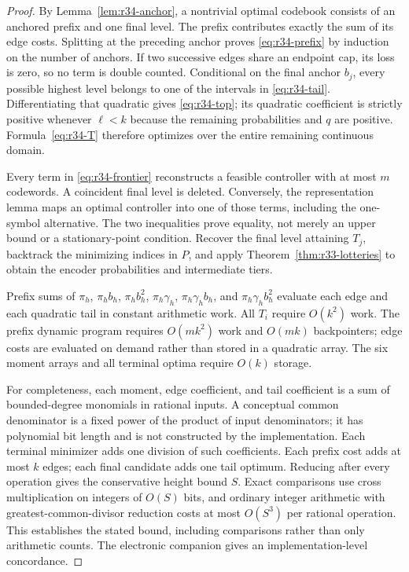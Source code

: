 \begin{proof}
By Lemma~\ref{lem:r34-anchor}, a nontrivial optimal codebook consists of an anchored prefix and one final level. The prefix contributes exactly the sum of its edge costs. Splitting at the preceding anchor proves \eqref{eq:r34-prefix} by induction on the number of anchors. If two successive edges share an endpoint cap, its loss is zero, so no term is double counted. Conditional on the final anchor $b_j$, every possible highest level belongs to one of the intervals in \eqref{eq:r34-tail}. Differentiating that quadratic gives \eqref{eq:r34-top}; its quadratic coefficient is strictly positive whenever $\ell<k$ because the remaining probabilities and $q$ are positive. Formula~\eqref{eq:r34-T} therefore optimizes over the entire remaining continuous domain.

Every term in \eqref{eq:r34-frontier} reconstructs a feasible controller with at most $m$ codewords. A coincident final level is deleted. Conversely, the representation lemma maps an optimal controller into one of those terms, including the one-symbol alternative. The two inequalities prove equality, not merely an upper bound or a stationary-point condition. Recover the final level attaining $T_j$, backtrack the minimizing indices in $P$, and apply Theorem~\ref{thm:r33-lotteries} to obtain the encoder probabilities and intermediate tiers.

Prefix sums of $\pi_h$, $\pi_hb_h$, $\pi_hb_h^2$, $\pi_h\gamma_h$, $\pi_h\gamma_hb_h$, and $\pi_h\gamma_hb_h^2$ evaluate each edge and each quadratic tail in constant arithmetic work. All $T_i$ require $O(k^2)$ work. The prefix dynamic program requires $O(mk^2)$ work and $O(mk)$ backpointers; edge costs are evaluated on demand rather than stored in a quadratic array. The six moment arrays and all terminal optima require $O(k)$ storage.

For completeness, each moment, edge coefficient, and tail coefficient is a sum of bounded-degree monomials in rational inputs. A conceptual common denominator is a fixed power of the product of input denominators; it has polynomial bit length and is not constructed by the implementation. Each terminal minimizer adds one division of such coefficients. Each prefix cost adds at most $k$ edges; each final candidate adds one tail optimum. Reducing after every operation gives the conservative height bound $S$. Exact comparisons use cross multiplication on integers of $O(S)$ bits, and ordinary integer arithmetic with greatest-common-divisor reduction costs at most $O(S^3)$ per rational operation. This establishes the stated bound, including comparisons rather than only arithmetic counts. The electronic companion gives an implementation-level concordance.\end{proof}

